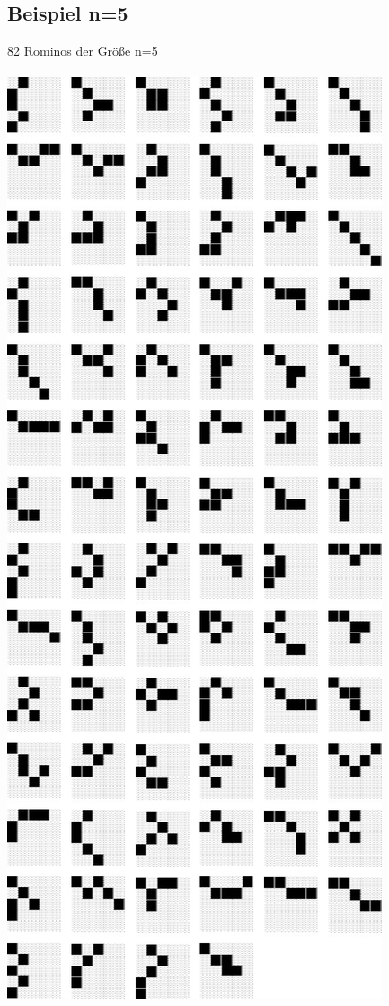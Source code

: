 \documentclass[a4paper,10pt]{scrartcl}
\begin{document}
\subsection{Beispiel n=5}
82 Rominos der Größe n=5 \\\\
\includegraphics{5.jpg}
\end{document}
